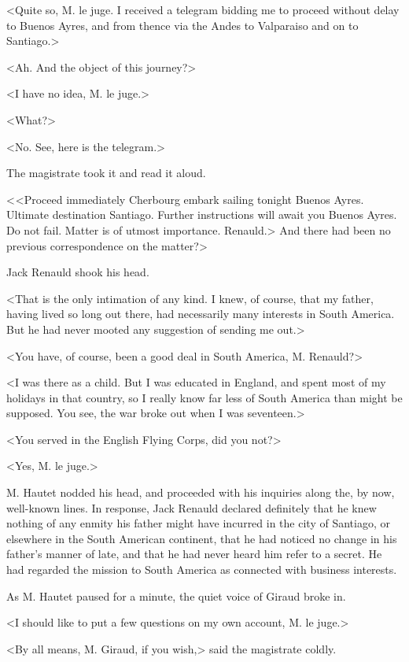  <Quite so, M. le juge. I received a telegram bidding me to proceed without delay to Buenos Ayres, and from thence via the Andes to Valparaiso and on to Santiago.> 

 <Ah. And the object of this journey?> 

 <I have no idea, M. le juge.> 

 <What?> 

 <No. See, here is the telegram.> 

 The magistrate took it and read it aloud. 

 < <Proceed immediately Cherbourg embark  sailing tonight Buenos Ayres. Ultimate destination Santiago. Further instructions will await you Buenos Ayres. Do not fail. Matter is of utmost importance. Renauld.> And there had been no previous correspondence on the matter?> 

 Jack Renauld shook his head. 

 <That is the only intimation of any kind. I knew, of course, that my father, having lived so long out there, had necessarily many interests in South America. But he had never mooted any suggestion of sending me out.> 

 <You have, of course, been a good deal in South America, M. Renauld?> 

 <I was there as a child. But I was educated in England, and spent most of my holidays in that country, so I really know far less of South America than might be supposed. You see, the war broke out when I was seventeen.> 

 <You served in the English Flying Corps, did you not?> 

 <Yes, M. le juge.> 

 M. Hautet nodded his head, and proceeded with his inquiries along the, by now, well-known lines. In response, Jack Renauld declared definitely that he knew nothing of any enmity his father might have incurred in the city of Santiago, or elsewhere in the South American continent, that he had noticed no change in his father's manner of late, and that he had never heard him refer to a secret. He had regarded the mission to South America as connected with business interests. 

 As M. Hautet paused for a minute, the quiet voice of Giraud broke in. 

 <I should like to put a few questions on my own account, M. le juge.> 

 <By all means, M. Giraud, if you wish,> said the magistrate coldly. 

